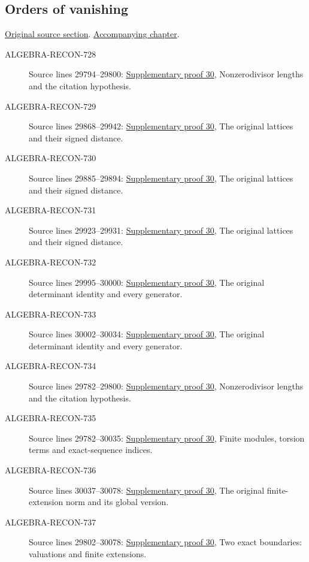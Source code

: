 \subsection{Orders of vanishing}
\hypertarget{algebra-source-section-orders-of-vanishing}{}
\noindent\href{https://github.com/stacks/stacks-project/blob/a04446e57ec1fbc252a871afcec7752fb2807b14/algebra.tex\#L29779}{Original source section}. \href{algebra.pdf\#nameddest=section-orders-of-vanishing}{Accompanying chapter}.

\begin{description}
\item[ALGEBRA-RECON-728] Source lines 29794--29800: \hyperlink{algebra_orders_notes_20260928}{Supplementary proof 30}, Nonzerodivisor lengths and the citation hypothesis.
\item[ALGEBRA-RECON-729] Source lines 29868--29942: \hyperlink{algebra_orders_notes_20260928}{Supplementary proof 30}, The original lattices and their signed distance.
\item[ALGEBRA-RECON-730] Source lines 29885--29894: \hyperlink{algebra_orders_notes_20260928}{Supplementary proof 30}, The original lattices and their signed distance.
\item[ALGEBRA-RECON-731] Source lines 29923--29931: \hyperlink{algebra_orders_notes_20260928}{Supplementary proof 30}, The original lattices and their signed distance.
\item[ALGEBRA-RECON-732] Source lines 29995--30000: \hyperlink{algebra_orders_notes_20260928}{Supplementary proof 30}, The original determinant identity and every generator.
\item[ALGEBRA-RECON-733] Source lines 30002--30034: \hyperlink{algebra_orders_notes_20260928}{Supplementary proof 30}, The original determinant identity and every generator.
\item[ALGEBRA-RECON-734] Source lines 29782--29800: \hyperlink{algebra_orders_notes_20260928}{Supplementary proof 30}, Nonzerodivisor lengths and the citation hypothesis.
\item[ALGEBRA-RECON-735] Source lines 29782--30035: \hyperlink{algebra_orders_notes_20260928}{Supplementary proof 30}, Finite modules, torsion terms and exact-sequence indices.
\item[ALGEBRA-RECON-736] Source lines 30037--30078: \hyperlink{algebra_orders_notes_20260928}{Supplementary proof 30}, The original finite-extension norm and its global version.
\item[ALGEBRA-RECON-737] Source lines 29802--30078: \hyperlink{algebra_orders_notes_20260928}{Supplementary proof 30}, Two exact boundaries: valuations and finite extensions.
\end{description}

